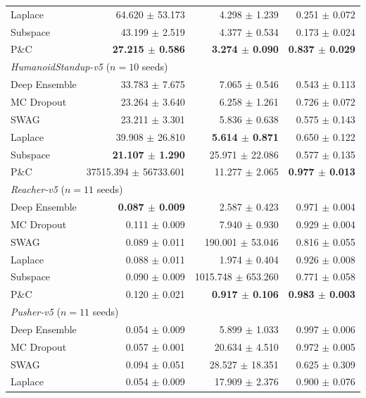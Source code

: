 \begin{table}[t]
\begin{tabular}{lrrr}
    Laplace & 64.620 $\pm$ 53.173 & 4.298 $\pm$ 1.239 & 0.251 $\pm$ 0.072 \\
    Subspace & 43.199 $\pm$ 2.519 & 4.377 $\pm$ 0.534 & 0.173 $\pm$ 0.024 \\
    P\&C & \textbf{27.215 $\pm$ 0.586} & \textbf{3.274 $\pm$ 0.090} & \textbf{0.837 $\pm$ 0.029} \\
    \midrule
    \multicolumn{4}{l}{\textit{HumanoidStandup-v5} ($n=10$ seeds)} \\
    Deep Ensemble & 33.783 $\pm$ 7.675 & 7.065 $\pm$ 0.546 & 0.543 $\pm$ 0.113 \\
    MC Dropout & 23.264 $\pm$ 3.640 & 6.258 $\pm$ 1.261 & 0.726 $\pm$ 0.072 \\
    SWAG & 23.211 $\pm$ 3.301 & 5.836 $\pm$ 0.638 & 0.575 $\pm$ 0.143 \\
    Laplace & 39.908 $\pm$ 26.810 & \textbf{5.614 $\pm$ 0.871} & 0.650 $\pm$ 0.122 \\
    Subspace & \textbf{21.107 $\pm$ 1.290} & 25.971 $\pm$ 22.086 & 0.577 $\pm$ 0.135 \\
    P\&C & 37515.394 $\pm$ 56733.601 & 11.277 $\pm$ 2.065 & \textbf{0.977 $\pm$ 0.013} \\
    \midrule
    \multicolumn{4}{l}{\textit{Reacher-v5} ($n=11$ seeds)} \\
    Deep Ensemble & \textbf{0.087 $\pm$ 0.009} & 2.587 $\pm$ 0.423 & 0.971 $\pm$ 0.004 \\
    MC Dropout & 0.111 $\pm$ 0.009 & 7.940 $\pm$ 0.930 & 0.929 $\pm$ 0.004 \\
    SWAG & 0.089 $\pm$ 0.011 & 190.001 $\pm$ 53.046 & 0.816 $\pm$ 0.055 \\
    Laplace & 0.088 $\pm$ 0.011 & 1.974 $\pm$ 0.404 & 0.926 $\pm$ 0.008 \\
    Subspace & 0.090 $\pm$ 0.009 & 1015.748 $\pm$ 653.260 & 0.771 $\pm$ 0.058 \\
    P\&C & 0.120 $\pm$ 0.021 & \textbf{0.917 $\pm$ 0.106} & \textbf{0.983 $\pm$ 0.003} \\
    \midrule
    \multicolumn{4}{l}{\textit{Pusher-v5} ($n=11$ seeds)} \\
    Deep Ensemble & 0.054 $\pm$ 0.009 & 5.899 $\pm$ 1.033 & 0.997 $\pm$ 0.006 \\
    MC Dropout & 0.057 $\pm$ 0.001 & 20.634 $\pm$ 4.510 & 0.972 $\pm$ 0.005 \\
    SWAG & 0.094 $\pm$ 0.051 & 28.527 $\pm$ 18.351 & 0.625 $\pm$ 0.309 \\
    Laplace & 0.054 $\pm$ 0.009 & 17.909 $\pm$ 2.376 & 0.900 $\pm$ 0.076 \\

\end{tabular}
\end{table}
